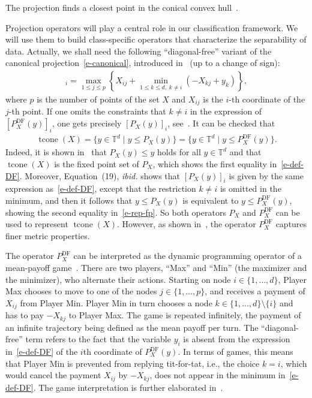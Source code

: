 \documentclass{article}
\newcommand{\tcone}{\operatorname{tcone}}
\renewcommand{\leq}{\leqslant}
\newcommand{\trop}{\mathbb{T}}
\begin{document}
The projection finds a closest point in the conical convex hull~\cite{cohen2004,AGNS10}.

Projection operators will play a central role in our classification framework. We will use them to build class-specific operators that characterize the separability of data.
Actually, we shall need the following ``diagonal-free'' variant of the canonical projection~\eqref{e-canonical},
introduced in~\cite[Equation~(9)]{akiangaubertqisaadi} (up to a change of sign):
\begin{align}
  [P_X^{\text{DF}}(y)]_i = \max_{1 \leq j \leq p} \left\{X_{ij} + \min_{1\leq k\leq d,\; k \neq i} (-X_{kj} + y_k)\right\},
  \label{e-def-DF}
\end{align}
where $p$ is the number of points of the set $X$ and $X_{ij}$ is the $i$-th coordinate of the $j$-th point.
If one omits the constraints that $k\neq i$ in the expression of $[P_X^{\text{DF}}(y)]_i$, one gets
precisely $[P_X(y)]_i$, see~\cite[Theorem~5]{cohen2004}. It can be checked that 
\begin{align}
  \label{e-rep-fp}
  \tcone(X)= \{y\in \trop^d\mid y\leq P_X(y)\} = \{y\in \trop^d\mid y\leq P_X^{\text{DF}}(y)\}.
\end{align}
Indeed, it is shown in~\cite[Section 3.1]{cohen2004} that $P_X(y)\leq y$ holds for all $y\in \trop^d$ and that $\tcone(X)$ is the fixed point set of $P_X$,
which shows the first equality in~\eqref{e-def-DF}. Moreover, Equation~(19), {\em ibid.} shows that $[P_X(y)]_i$ is given by the same expression as~\eqref{e-def-DF}, except that the restriction $k\neq i$ is omitted in the minimum, and then it follows that $y\leq P_X(y)$ is equivalent to $y\leq P_X^{\text{DF}}(y)$,
showing the second equality in~\eqref{e-rep-fp}.
So both operators $P_X$ and $P_X^{\text{DF}}$ can be used to represent $\tcone(X)$. However, as shown in~\cite[Theorem~6]{akiangaubertqisaadi}, the operator $P_X^{\text{DF}}$ captures finer metric properties.

The operator $P_X^{\text{DF}}$ can be interpreted as the dynamic programming operator of a mean-payoff game~\cite{AGGut10}.
There are two players, ``Max'' and ``Min'' (the maximizer
and the minimizer), who alternate their actions. Starting on node
$i\in \{1,\dots,d\}$, Player Max chooses to move to one of the nodes $j\in \{1,\dots,p\}$, and receives a payment of $X_{ij}$
from Player Min. Player Min in turn chooses a node $k\in \{1,\dots,d\}\setminus\{i\}$ and has to pay $-X_{kj}$ to Player Max. The game is repeated infinitely,
the payment of an infinite trajectory being defined as the mean payoff per turn.
The ``diagonal-free'' term refers to the fact that the variable $y_i$
is absent from the expression in~\eqref{e-def-DF}
of the $i$th coordinate of  $P_X^{\text{DF}}(y)$. In terms
  of games, this means that Player Min is prevented from replying tit-for-tat,
  i.e., the choice $k=i$, which would cancel the payment $X_{ij}$
  by $-X_{kj}$, does not appear in the minimum in~\eqref{e-def-DF}.
  The game interpretation is further elaborated in~\cite{akiangaubertqisaadi}.
\end{document}
